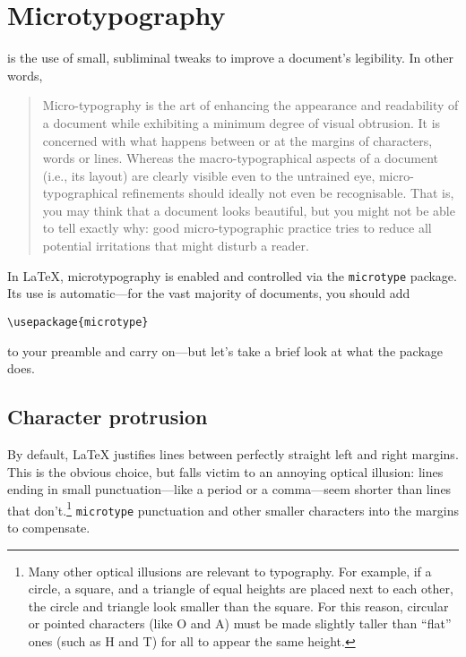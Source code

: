\chapter{Microtypography}
\label{microtype}

 is the use of small, subliminal tweaks to improve
a document's legibility.
In other words,
\begin{quote}
Micro-typography is the art of enhancing the appearance and readability of a
document while exhibiting a minimum degree of visual obtrusion.
It is concerned with what happens between or at the margins of characters,
words or lines. Whereas the macro-typographical aspects of a document
(i.e., its layout) are clearly visible even to the untrained eye,
micro-typographical refinements should ideally not even be recognisable.
That is, you may think that a document looks beautiful, but you
might not be able to tell exactly why: good micro-typographic practice tries to
reduce all potential irritations that might disturb a reader.\punckern{}
\end{quote}

In \LaTeX{}, microtypography is enabled and controlled via the
\texttt{microtype} package.
Its use is automatic---for the vast majority of documents, you should add
\begin{leftfigure}
\begin{lstlisting}
\usepackage{microtype}
\end{lstlisting}
\end{leftfigure}
to your preamble and carry on---but let's take a brief look at what the package
does.

\section{Character protrusion}

By default, \LaTeX{} justifies lines between perfectly straight
left and right margins.
This is the obvious choice,
but falls victim to an annoying optical illusion:
lines ending in small punctuation---like a period or a
comma---seem shorter than lines that
don't.\punckern\footnote{Many other optical illusions are
relevant to typography. For example, if a circle, a square, and a triangle
of equal heights are placed next to each other,
the circle and triangle look smaller than the square.
For this reason, circular or pointed characters (like O and A) must
be made slightly taller than ``flat'' ones (such as H and T) for all
to appear the same height.\punckern{}}
\texttt{microtype}  punctuation and other smaller
characters into the margins to compensate.

